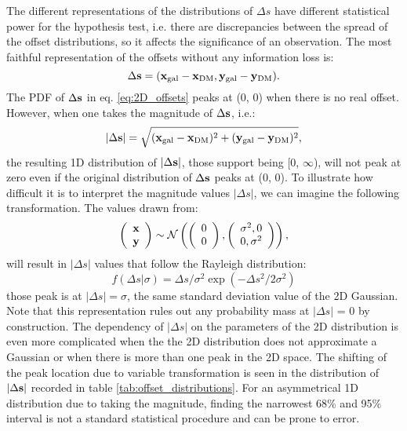 The different representations of the distributions of $\Delta s$ have different 
statistical power for the hypothesis test, i.e. there are discrepancies between
the spread of the offset distributions, so
it affects the significance of an observation. 
The most faithful representation of the offsets without any information loss
is:
\begin{equation}
	\Delta {\bf s} = ({\bf x}_{\rm gal} - {\bf x}_{\rm DM}, 
	{\bf y}_{\rm gal} - {\bf y}_{\rm DM} ).
	\label{eq:2D_offsets}
\end{equation}
The PDF of $\Delta {\bf s}$ in eq. \ref{eq:2D_offsets} peaks at (0, 0) when there is no real offset.
However, when one takes the magnitude of $\Delta {\bf s}$, i.e.:
\begin{equation}
	|\Delta {\bf s}| = \sqrt{({\bf x}_{\rm gal} - {\bf x}_{\rm DM})^2 + 
	({\bf y}_{\rm gal} - {\bf y}_{\rm DM})^2},
	\label{eq:magnitude_offsets}
\end{equation}
the resulting 1D distribution of $|\Delta {\bf s}|$, 
those support being [0, $\infty$),
will not peak at zero even if the original
distribution of $\Delta {\bf s}$ peaks at (0, 0). 
To illustrate how difficult it is to interpret the magnitude values $|\Delta
s|$,  
we can imagine the following transformation.
The values drawn from: 
\begin{equation}
	\left(\begin{array}{c}
			\bf{x}\\
			\bf{y}
		\end{array}
	\right) \sim \mathcal{N}\left(
	\left(
		\begin{array}{c}
			0 \\
			0
		\end{array}
	\right),
	\left(\begin{array}{cc}
		\sigma^2, 0 \\
		0, \sigma^2
	 \end{array}
	\right)
\right),
\end{equation}
will result in $|\Delta s|$ values that follow the Rayleigh distribution:
\begin{equation}
	f(\Delta s | \sigma) = \Delta s /  \sigma^2 \exp(-\Delta s^2 / 2 \sigma^2)
\end{equation}
those peak is at $|\Delta s| = \sigma$, the same standard deviation value of the 2D
Gaussian. Note that this representation  
rules out any probability mass at $|\Delta s|$ = 0 by construction. 
The dependency of $|\Delta s|$ on the parameters of
the 2D distribution is even more
complicated when the the 2D distribution does not approximate a Gaussian 
or when there is more than one peak in the 2D space. 
The shifting of the peak location due to variable transformation 
is seen in the distribution of $|\Delta {\bf s}|$ recorded in table
\ref{tab:offset_distributions}.
For an asymmetrical 1D distribution due to taking the magnitude, 
finding the narrowest 68\% and 95\% interval
is not a standard statistical procedure and can be prone to error.

